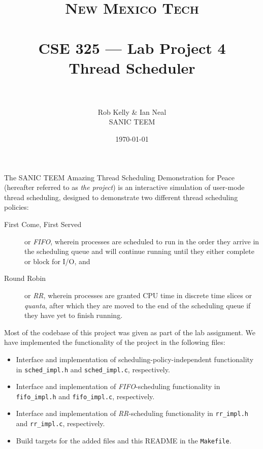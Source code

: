 \documentclass[paper=a4, fontsize=11pt]{scrartcl}
\title{
  \normalfont \normalsize 
  \textsc{New Mexico Tech} \\ [25pt]
  \horrule{0.5pt} \\[0.4cm]
  \huge CSE 325 --- Lab Project 4 \\ Thread Scheduler \\
  \horrule{2pt} \\[0.5cm]
}
\author{Rob Kelly \& Ian Neal \\ SANIC TEEM}
\date{\normalsize\today}
\begin{document}
\maketitle

The SANIC TEEM Amazing Thread Scheduling Demonstration for Peace (hereafter referred to as \textit{the project}) is an interactive simulation of user-mode thread scheduling, designed to demonstrate two different thread scheduling policies:

\begin{description}
  \item[First Come, First Served] or \textit{FIFO}, wherein processes are scheduled to run in the order they arrive in the scheduling queue and will continue running until they either complete or block for I/O, and

  \item[Round Robin] or \textit{RR}, wherein processes are granted CPU time in discrete time slices or \textit{quanta}, after which they are moved to the end of the scheduling queue if they have yet to finish running.
\end{description}

Most of the codebase of this project was given as part of the lab assignment. We have implemented the functionality of the project in the following files:

\begin{itemize}
  \item Interface and implementation of scheduling-policy-independent functionality in \texttt{sched\_impl.h} and \texttt{sched\_impl.c}, respectively.

  \item Interface and implementation of \textit{FIFO}-scheduling functionality in \texttt{fifo\_impl.h} and \texttt{fifo\_impl.c}, respectively.

  \item Interface and implementation of \textit{RR}-scheduling functionality in \texttt{rr\_impl.h} and \texttt{rr\_impl.c}, respectively.

  \item Build targets for the added files and this README in the \texttt{Makefile}.
\end{itemize}

\end{document}
